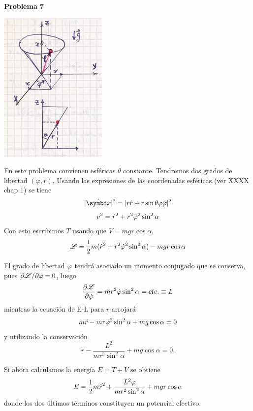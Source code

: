 \documentclass[10pt,oneside]{CBFT_book}
\begin{document}
\begin{ejemplo}{\bf Problema 7}
 
\includegraphics[scale=0.35]{images/fig_mc_problema_cono.jpg}

En este problema convienen esféricas $\theta$ constante. Tendremos dos grados de libertad $(\varphi,r)$.
Usando las expresiones de las coordenadas esféricas (ver XXXX chap 1) se tiene 
\[
	| \dot{\vb{x}} |^2 = | \dot{r}\hat{r} + r\sin\theta \dot{\vp} \hat{\vp} |^2
\]
\[
	v^2 = \dot{r}^2 + r^2 \dot{ \varphi }^2 \sin^2 \alpha
\]
Con esto escribimos $T$ usando que $V = mgr\cos\alpha$,
\[
	\mathscr{L} = \frac 1 2 m (\dot{r}^2 + r^2 \dot{ \varphi }^2 \sin^2 \alpha) - mgr \cos\alpha 
\]

El grado de libertad $\varphi$ tendrá asociado un momento conjugado que se conserva, pues $\partial\mathscr{L}/\partial \varphi = 0$,
luego
\[
	\frac{\partial^{\hspace{-0.05em}} {\mathscr{L}}}{\partial {\dot{\varphi}}^{\hspace{-0.05em}}} = mr^2 \dot{\varphi} \sin^2 \alpha = cte. \equiv L
\]
mientras la ecuación de E-L para $r$ arrojará
\[
	m\ddot{r} - m r \dot{\varphi}^2 \sin^2\alpha + mg\cos\alpha = 0
\]
y utilizando la conservación 
\[
	\ddot{r} - \frac{L^2}{mr^3\sin^2\alpha} + mg\cos\alpha = 0.
\]

Si ahora calculamos la energía $E=T+V$ se obtiene 
\[
	E = \frac 1 2 m \dot{r}^2 + \frac{L^2 \varphi}{ m r^2 \sin^2 \alpha } + mgr\cos\alpha
\]
donde los dos últimos términos constituyen un potencial efectivo.
 
\end{ejemplo}
\end{document}
